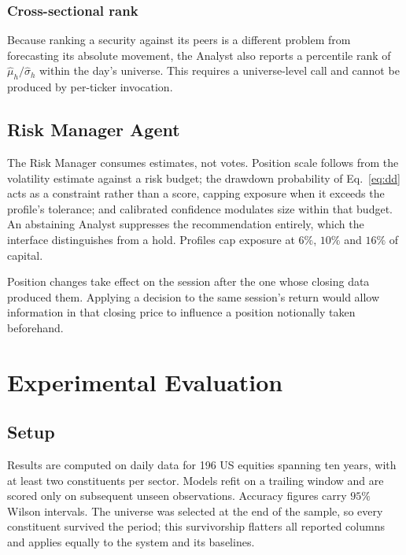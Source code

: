 \documentclass[conference]{IEEEtran}
\begin{document}
\subsubsection{Cross-sectional rank}
Because ranking a security against its peers is a different problem from
forecasting its absolute movement, the Analyst also reports a percentile rank
of $\hat{\mu}_h/\hat{\sigma}_h$ within the day's universe. This requires a
universe-level call and cannot be produced by per-ticker invocation.

\subsection{Risk Manager Agent}
The Risk Manager consumes estimates, not votes. Position scale follows from
the volatility estimate against a risk budget; the drawdown probability of
Eq.~\eqref{eq:dd} acts as a constraint rather than a score, capping exposure
when it exceeds the profile's tolerance; and calibrated confidence modulates
size within that budget. An abstaining Analyst suppresses the recommendation
entirely, which the interface distinguishes from a hold. Profiles cap
exposure at $6\%$, $10\%$ and $16\%$ of capital.

Position changes take effect on the session after the one whose closing data
produced them. Applying a decision to the same session's return would allow
information in that closing price to influence a position notionally taken
beforehand.

\section{Experimental Evaluation}
\label{sec:evaluation}

\subsection{Setup}
Results are computed on daily data for 196 US equities spanning ten years,
with at least two constituents per sector. Models refit on a trailing window
and are scored only on subsequent unseen observations. Accuracy figures carry
$95\%$ Wilson intervals. The universe was selected at the end of the sample,
so every constituent survived the period; this survivorship flatters all
reported columns and applies equally to the system and its baselines.
\end{document}
